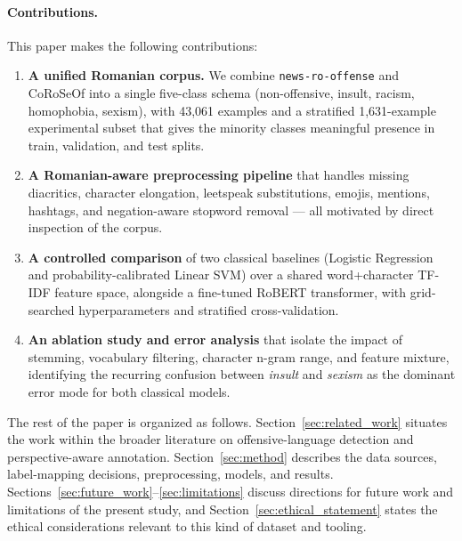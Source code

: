 \paragraph{Contributions.}
This paper makes the following contributions:
\begin{enumerate}
    \item \textbf{A unified Romanian corpus.} We combine \texttt{news-ro-offense} \citep{readerbenchNewsRoOffense} and CoRoSeOf \citep{coroseof} into a single five-class schema (non-offensive, insult, racism, homophobia, sexism), with 43{,}061 examples and a stratified 1{,}631-example experimental subset that gives the minority classes meaningful presence in train, validation, and test splits.
    \item \textbf{A Romanian-aware preprocessing pipeline} that handles missing diacritics, character elongation, leetspeak substitutions, emojis, mentions, hashtags, and negation-aware stopword removal --- all motivated by direct inspection of the corpus.
    \item \textbf{A controlled comparison} of two classical baselines (Logistic Regression and probability-calibrated Linear SVM) over a shared word+character TF-IDF feature space, alongside a fine-tuned RoBERT transformer, with grid-searched hyperparameters and stratified cross-validation.
    \item \textbf{An ablation study and error analysis} that isolate the impact of stemming, vocabulary filtering, character n-gram range, and feature mixture, identifying the recurring confusion between \textit{insult} and \textit{sexism} as the dominant error mode for both classical models.
\end{enumerate}

The rest of the paper is organized as follows. Section~\ref{sec:related_work} situates the work within the broader literature on offensive-language detection and perspective-aware annotation. Section~\ref{sec:method} describes the data sources, label-mapping decisions, preprocessing, models, and results. Sections~\ref{sec:future_work}--\ref{sec:limitations} discuss directions for future work and limitations of the present study, and Section~\ref{sec:ethical_statement} states the ethical considerations relevant to this kind of dataset and tooling.
